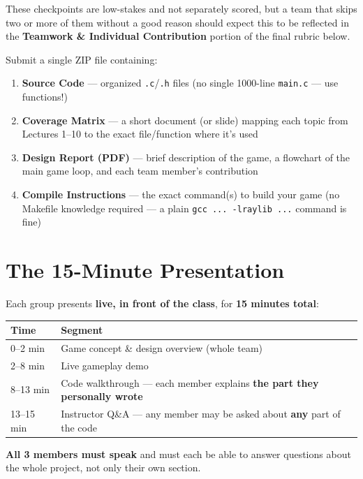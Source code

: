 \documentclass[11pt]{article}
\begin{document}
These checkpoints are low-stakes and not separately scored, but a team that skips two or more of
them without a good reason should expect this to be reflected in the \textbf{Teamwork \&
Individual Contribution} portion of the final rubric below.

\begin{deliverables}
Submit a single ZIP file containing:
\begin{enumerate}[leftmargin=*,nosep]
  \item \textbf{Source Code} --- organized \texttt{.c}/\texttt{.h} files (no single 1000-line \texttt{main.c} --- use functions!)
  \item \textbf{Coverage Matrix} --- a short document (or slide) mapping each topic from Lectures 1--10 to the exact file/function where it's used
  \item \textbf{Design Report (PDF)} --- brief description of the game, a flowchart of the main game loop, and each team member's contribution
  \item \textbf{Compile Instructions} --- the exact command(s) to build your game (no Makefile knowledge required --- a plain \texttt{gcc ... -lraylib ...} command is fine)
\end{enumerate}
\end{deliverables}

\section*{The 15-Minute Presentation}

Each group presents \textbf{live, in front of the class}, for \textbf{15 minutes total}:

\begin{center}
\begin{tabular}{@{}lp{9cm}@{}}
\toprule
Time & Segment \\
\midrule
0--2 min & Game concept \& design overview (whole team) \\
2--8 min & Live gameplay demo \\
8--13 min & Code walkthrough --- each member explains \textbf{the part they personally wrote} \\
13--15 min & Instructor Q\&A --- any member may be asked about \textbf{any} part of the code \\
\bottomrule
\end{tabular}
\end{center}

\textbf{All 3 members must speak} and must each be able to answer questions about the whole
project, not only their own section.
\end{document}
